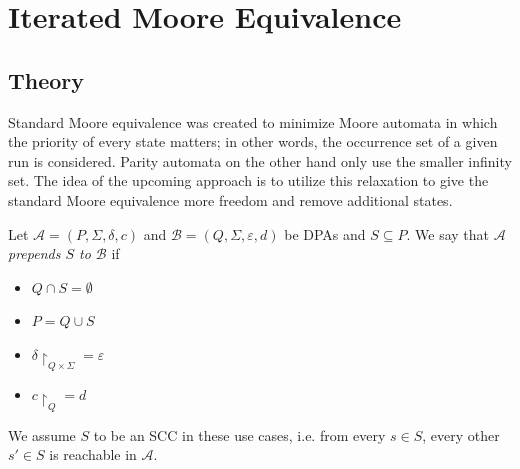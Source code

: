 
\chapter{Iterated Moore Equivalence}
\label{chap:imoore}

\section{Theory}
Standard Moore equivalence was created to minimize Moore automata in which the priority of every state matters; in other words, the occurrence set of a given run is considered. Parity automata on the other hand only use the smaller infinity set. The idea of the upcoming approach is to utilize this relaxation to give the standard Moore equivalence more freedom and remove additional states.

\begin{defn}
	Let $\mathcal{A} = (P, \Sigma, \delta, c)$ and $\mathcal{B} = (Q, \Sigma, \varepsilon, d)$ be DPAs and $S \subseteq P$. We say that \emph{$\mathcal{A}$ prepends $S$ to $\mathcal{B}$} if 
	\begin{itemize}
		\item $Q \cap S = \emptyset$
		\item $P = Q \cup S$
		\item $\delta\upharpoonright_{Q \times \Sigma} = \varepsilon$
		\item $c\upharpoonright_Q = d$
	\end{itemize}
	
	We assume $S$ to be an SCC in these use cases, i.e. from every $s \in S$, every other $s' \in S$ is reachable in $\mathcal{A}$.
\end{defn} 

